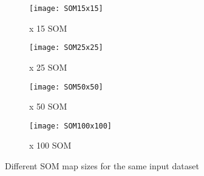 \documentclass{article}
\begin{document}
\begin{figure*}[htbp]
	\begin{minipage}[t]{0.47\linewidth}
		\begin{subfigure}{1\linewidth}
			\centering 
			\texttt{[image: SOM15x15]}
			\caption{ x 15 SOM }
			\label{Fig-SOM15}
		\end{subfigure}
	\end{minipage}
	\begin{minipage}[t]{0.47\linewidth}
	\begin{subfigure}{1\linewidth}
		\centering 
		\texttt{[image: SOM25x25]}
		\caption{ x 25 SOM}
		\label{Fig-SOM25}
	\end{subfigure}
	\end{minipage}

	\begin{minipage}[t]{0.47\linewidth}
	\begin{subfigure}{1\linewidth}
		\centering 
		\texttt{[image: SOM50x50]}
		\caption{ x 50 SOM}
		\label{Fig-SOM50}
	\end{subfigure}
	\end{minipage}
	\begin{minipage}[t]{0.47\linewidth}
	\begin{subfigure}{1\linewidth}
		\centering 
		\texttt{[image: SOM100x100]}
		\caption{ x 100 SOM}
		\label{Fig-SOM100}
	\end{subfigure}
\end{minipage}

\caption{Different SOM map sizes for the same input dataset}
\label{Fig-SOM}
\end{figure*}
\end{document}
